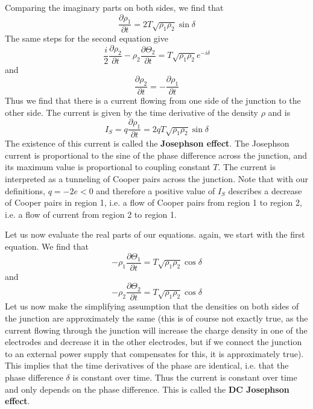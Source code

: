\documentclass[a4paper, draft]{article}
\theoremstyle{own}
\theoremstyle{remark}
\begin{document}
Comparing the imaginary parts on both sides, we find that
$$
\frac{\partial \rho_1}{\partial t} = 2 T \sqrt{\rho_1 \rho_2} \sin \delta
$$
The same steps for the second equation give
$$
\frac{i }{2} \frac{\partial \rho_2}{\partial t} 
- 
\rho_2 \frac{\partial \Theta_2}{\partial t}
=
T \sqrt{\rho_1 \rho_2} e^{-i\delta}
$$
and
$$
\frac{\partial \rho_2}{\partial t} = - \frac{\partial \rho_1}{\partial t}
$$
Thus we find that there is a current flowing from one side of the junction to the other side. The current is given by the time derivative of the density $\rho$ and is 
$$
I_S = q \frac{\partial \rho_1}{\partial t} = 2 q T \sqrt{\rho_1 \rho_2} \sin \delta
$$
The existence of this current is called the {\bf Josephson effect}.  The Josephson current is proportional to the sine of the phase difference across the junction, and its maximum value is proportional to coupling constant $T$. The current is interpreted as a tunneling of Cooper pairs across the junction. Note that with our definitions, $q = -2e < 0$ and therefore a positive value of $I_S$ describes a decrease of Cooper pairs in region 1, i.e. a flow of Cooper pairs from region 1 to region 2, i.e. a flow of current from region 2 to region 1. 

Let us now evaluate the real parts of our equations. again, we start with the first equation. We find that
$$
- \rho_1 \frac{\partial \Theta_1}{\partial t} = T \sqrt{\rho_1 \rho_2 } \cos \delta
$$
and
$$
- \rho_2 \frac{\partial \Theta_2}{\partial t} = T \sqrt{\rho_1 \rho_2 } \cos \delta
$$
Let us now make the simplifying assumption that the densities on both sides of the junction are approximately the same (this is of course not exactly true, as the current flowing through the junction will increase the charge density in one of the electrodes and decrease it in the other electrodes, but if we connect the junction to an external power supply that compensates for this, it is approximately true). This implies that the time derivatives of the phase are identical, i.e. that the phase difference $\delta$ is constant over time. Thus the current is constant over time and only depends on the phase difference. This is called the {\bf DC Josephson effect}.
\end{document}
